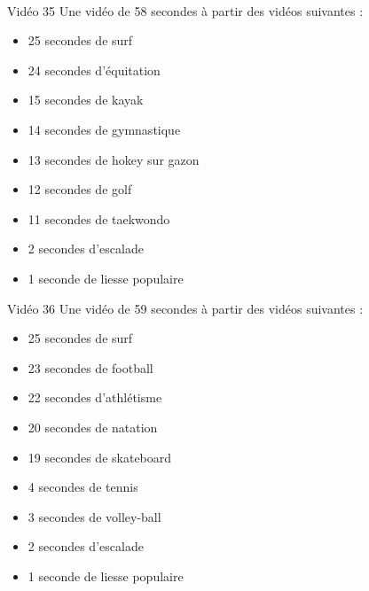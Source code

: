 \documentclass[10pt, a5paper,twoside]{article}
\begin{document}
\vfill

\clearpage
~
\vfill

\begin{card}[width = \textwidth, colback = olympicviolet, colframe = olympicviolet, bottomtitle = 2mm]{Vidéo 35}
  Une vidéo de 58 secondes à partir des vidéos suivantes :
  \vspace{-1mm}\begin{itemize}
    \item 25 secondes de surf
    \item 24 secondes d'équitation
    \item 15 secondes de kayak
    \item 14 secondes de gymnastique
    \item 13 secondes de hokey sur gazon
    \item 12 secondes de golf
    \item 11 secondes de taekwondo
    \item 2 secondes d'escalade
    \item 1 seconde de liesse populaire
  \end{itemize}
\end{card}

\vfill

\begin{card}[width = \textwidth, colback = olympicviolet, colframe = olympicviolet, bottomtitle = 2mm]{Vidéo 36}
  Une vidéo de 59 secondes à partir des vidéos suivantes :
  \vspace{-1mm}\begin{itemize}
    \item 25 secondes de surf
    \item 23 secondes de football
    \item 22 secondes d'athlétisme
    \item 20 secondes de natation
    \item 19 secondes de skateboard
    \item 4 secondes de tennis
    \item 3 secondes de volley-ball
    \item 2 secondes d'escalade
    \item 1 seconde de liesse populaire
  \end{itemize}
\end{card}

\vfill

\clearpage
~
\vfill
\end{document}
